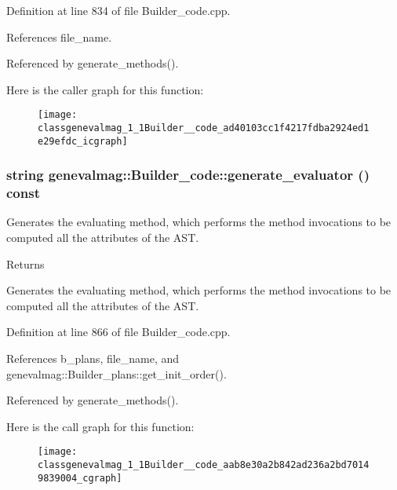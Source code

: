 Definition at line 834 of file Builder\_\-code.cpp.



References file\_\-name.



Referenced by generate\_\-methods().



Here is the caller graph for this function:\nopagebreak
\begin{figure}[H]
\begin{center}
\leavevmode
\texttt{[image: classgenevalmag\_1\_1Builder\_\_code\_ad40103cc1f4217fdba2924ed1e29efdc\_icgraph]}
\end{center}
\end{figure}


\hypertarget{classgenevalmag_1_1Builder__code_aab8e30a2b842ad236a2bd70149839004}{
\subsubsection[{generate\_\-evaluator}]{\setlength{\rightskip}{0pt plus 5cm}string genevalmag::Builder\_\-code::generate\_\-evaluator () const}}
\label{classgenevalmag_1_1Builder__code_aab8e30a2b842ad236a2bd70149839004}
Generates the evaluating method, which performs the method invocations to be computed all the attributes of the AST. \begin{DoxyReturn}{Returns}

\end{DoxyReturn}
Generates the evaluating method, which performs the method invocations to be computed all the attributes of the AST. 

Definition at line 866 of file Builder\_\-code.cpp.



References b\_\-plans, file\_\-name, and genevalmag::Builder\_\-plans::get\_\-init\_\-order().



Referenced by generate\_\-methods().



Here is the call graph for this function:\nopagebreak
\begin{figure}[H]
\begin{center}
\leavevmode
\texttt{[image: classgenevalmag\_1\_1Builder\_\_code\_aab8e30a2b842ad236a2bd70149839004\_cgraph]}
\end{center}
\end{figure}




